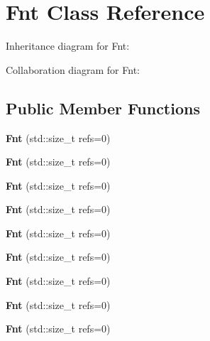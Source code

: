 \hypertarget{class_fnt}{}\section{Fnt Class Reference}
\label{class_fnt}


Inheritance diagram for Fnt\+:


Collaboration diagram for Fnt\+:
\subsection*{Public Member Functions}
\begin{DoxyCompactItemize}
\item 
\mbox{\label{class_fnt_ab5b9724f843ec736c7299a294374294b}} 
{\bfseries Fnt} (std\+::size\+\_\+t refs=0)
\item 
\mbox{\label{class_fnt_ab5b9724f843ec736c7299a294374294b}} 
{\bfseries Fnt} (std\+::size\+\_\+t refs=0)
\item 
\mbox{\label{class_fnt_ab5b9724f843ec736c7299a294374294b}} 
{\bfseries Fnt} (std\+::size\+\_\+t refs=0)
\item 
\mbox{\label{class_fnt_ab5b9724f843ec736c7299a294374294b}} 
{\bfseries Fnt} (std\+::size\+\_\+t refs=0)
\item 
\mbox{\label{class_fnt_ab5b9724f843ec736c7299a294374294b}} 
{\bfseries Fnt} (std\+::size\+\_\+t refs=0)
\item 
\mbox{\label{class_fnt_ab5b9724f843ec736c7299a294374294b}} 
{\bfseries Fnt} (std\+::size\+\_\+t refs=0)
\item 
\mbox{\label{class_fnt_ab5b9724f843ec736c7299a294374294b}} 
{\bfseries Fnt} (std\+::size\+\_\+t refs=0)
\item 
\mbox{\label{class_fnt_ab5b9724f843ec736c7299a294374294b}} 
{\bfseries Fnt} (std\+::size\+\_\+t refs=0)
\item 
\mbox{\label{class_fnt_ab5b9724f843ec736c7299a294374294b}} 
{\bfseries Fnt} (std\+::size\+\_\+t refs=0)
\item 
\mbox{\label{class_fnt_a333724637c8eef176138898f68e57470}} 

\end{DoxyCompactItemize}
